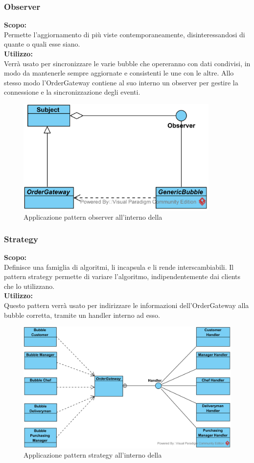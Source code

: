 \subsubsection{Observer}
\textbf{Scopo:} \\
Permette l'aggiornamento di più viste contemporaneamente, disinteressandosi di quante o quali esse siano.\\
\textbf{Utilizzo:} \\
Verrà usato per sincronizzare le varie bubble che opereranno con dati condivisi, in modo da mantenerle sempre aggiornate e consistenti le une con le altre. Allo stesso modo l'OrderGateway contiene al suo interno un observer per gestire la connessione e la sincronizzazione degli eventi.
\begin{figure}[H]
	\centering
	\includegraphics[width=10cm]{./diagrammi_img/applicazione_pattern/observer_demo.png}
	\caption{Applicazione pattern observer all'interno della \DemoName}
\end{figure}

\subsubsection{Strategy}
\textbf{Scopo:} \\
Definisce una famiglia di algoritmi, li incapsula e li rende interscambiabili. Il pattern strategy permette di variare l'algoritmo, indipendentemente dai clients che lo utilizzano.\\
\textbf{Utilizzo:} \\
Questo pattern verrà usato per indirizzare le informazioni dell'OrderGateway alla bubble corretta, tramite un handler interno ad esso.
\begin{figure}[H]
	\centering
	\includegraphics[width=15cm]{./diagrammi_img/applicazione_pattern/strategy_demo.png}
	\caption{Applicazione pattern strategy all'interno della \DemoName}
\end{figure}